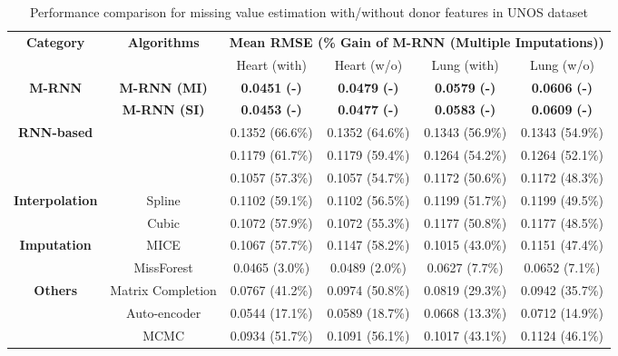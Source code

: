 \documentclass{article}
\begin{document}
\begin{table*}[t!]
	\caption{Performance comparison for missing value estimation with/without donor features in UNOS dataset }
	\label{tab:DonorImputation}
	\centering
	\small
	\begin{tabular}{c|c|c|c|c|c}
		\toprule
		\multirow{2}{*}{\textbf{Category}}&\multirow{2}{*}{\textbf{Algorithms}}&\multicolumn{4}{c}{\textbf{Mean RMSE (\% Gain of M-RNN (Multiple Imputations))}}  \\
		\cmidrule{3-6}
		& & Heart (with) & Heart (w/o) & Lung (with) & Lung (w/o) \\
		\midrule
		\multirow{2}{*}{\textbf{M-RNN}}&\textbf{M-RNN (MI)} &  \textbf{0.0451}  \textbf{(-)}  &\textbf{0.0479}  \textbf{(-)}&\textbf{0.0579}  \textbf{(-)}&\textbf{0.0606}  \textbf{(-)} \\
		&\textbf{M-RNN (SI)} &  \textbf{0.0453}  \textbf{(-)}  &\textbf{0.0477}  \textbf{(-)}&\textbf{0.0583}  \textbf{(-)}&\textbf{0.0609}  \textbf{(-)} \\
		\midrule
		\multirow{3}{*}{\textbf{RNN-based}}&\cite{Recent_RNN1} & 0.1352 (66.6\%)&0.1352 (64.6\%) & 0.1343 (56.9\%) & 0.1343 (54.9\%) \\
		&\cite{Recent_RNN2} &0.1179 (61.7\%) &0.1179 (59.4\%)& 0.1264 (54.2\%) & 0.1264 (52.1\%)\\
		&\cite{Recent_RNN3} &0.1057 (57.3\%) &0.1057 (54.7\%)&  0.1172 (50.6\%) & 0.1172 (48.3\%) \\
		\midrule
		\multirow{2}{*}{\textbf{Interpolation}} & Spline    &0.1102  (59.1\%) &0.1102  (56.5\%)& 0.1199 (51.7\%) & 0.1199 (49.5\%)\\
		& Cubic  & 0.1072 (57.9\%)&0.1072 (55.3\%)&  0.1177 (50.8\%) & 0.1177 (48.5\%)\\
		\midrule
		\multirow{2}{*}{\textbf{Imputation}} & MICE &  0.1067 (57.7\%) &0.1147  (58.2\%)& 0.1015 (43.0\%) & 0.1151  (47.4\%)\\
		&MissForest & 0.0465 (3.0\%)& 0.0489  (2.0\%)& 0.0627 (7.7\%) & 0.0652  (7.1\%) \\ 
		\midrule
		\multirow{3}{*}{\textbf{Others}} & Matrix Completion   & 0.0767 (41.2\%) &0.0974  (50.8\%)& 0.0819 (29.3\%)& 0.0942 (35.7\%)  \\
		&Auto-encoder   & 0.0544 (17.1\%) &0.0589 (18.7\%) & 0.0668 (13.3\%) & 0.0712 (14.9\%) \\		
		& MCMC   & 0.0934 (51.7\%) &0.1091 (56.1\%) & 0.1017 (43.1\%) & 0.1124 (46.1\%) \\				
		\bottomrule
	\end{tabular}
\end{table*}
\end{document}
